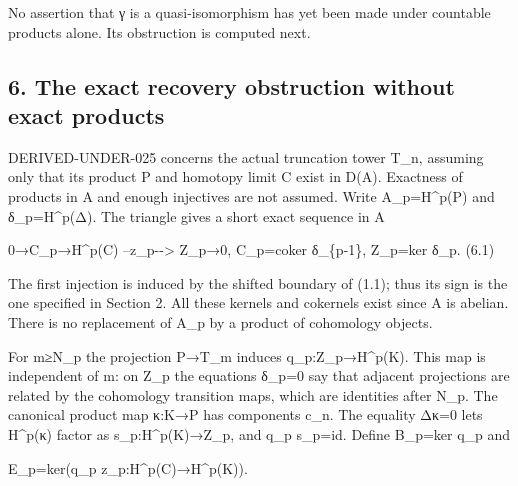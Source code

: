 \documentclass[11pt]{article}
\begin{document}
No assertion that γ is a quasi-isomorphism has yet been made under countable products alone. Its obstruction is computed next.

\subsection{6. The exact recovery obstruction without exact products}\label{proofs-10435-10686-the-exact-recovery-obstruction-without-exact-products}

DERIVED-UNDER-025 concerns the actual truncation tower T\_\allowbreak{}n,\allowbreak{} assuming only that its product P and homotopy limit C exist in D(A)\allowbreak{}. Exactness of products in A and enough injectives are not assumed. Write A\_\allowbreak{}p\allowbreak{}=H\textasciicircum{}p(P)\allowbreak{} and δ\_\allowbreak{}p\allowbreak{}=H\textasciicircum{}p(Δ)\allowbreak{}. The triangle gives a short exact sequence in A

0\allowbreak{}→C\_\allowbreak{}p\allowbreak{}→H\textasciicircum{}p(C)\allowbreak{} --z\_\allowbreak{}p-\allowbreak{}-> Z\_\allowbreak{}p\allowbreak{}→0,\allowbreak{} C\_\allowbreak{}p\allowbreak{}=coker δ\_\allowbreak{}\{p-1\},\allowbreak{} Z\_\allowbreak{}p\allowbreak{}=ker δ\_\allowbreak{}p. (6.1)\allowbreak{}

The first injection is induced by the shifted boundary of (1.1)\allowbreak{}; thus its sign is the one specified in Section 2. All these kernels and cokernels exist since A is abelian. There is no replacement of A\_\allowbreak{}p by a product of cohomology objects.

For m≥N\_\allowbreak{}p the projection P\allowbreak{}→T\_\allowbreak{}m induces q\_\allowbreak{}p:\allowbreak{}Z\_\allowbreak{}p\allowbreak{}→H\textasciicircum{}p(K)\allowbreak{}. This map is independent of m:\allowbreak{} on Z\_\allowbreak{}p the equations δ\_\allowbreak{}p\allowbreak{}=0 say that adjacent projections are related by the cohomology transition maps,\allowbreak{} which are identities after N\_\allowbreak{}p. The canonical product map κ:\allowbreak{}K\allowbreak{}→P has components c\_\allowbreak{}n. The equality Δκ\allowbreak{}=0 lets H\textasciicircum{}p(κ)\allowbreak{} factor as s\_\allowbreak{}p:\allowbreak{}H\textasciicircum{}p(K)\allowbreak{}\allowbreak{}→Z\_\allowbreak{}p,\allowbreak{} and q\_\allowbreak{}p s\_\allowbreak{}p\allowbreak{}=id. Define B\_\allowbreak{}p\allowbreak{}=ker q\_\allowbreak{}p and

E\_\allowbreak{}p\allowbreak{}=ker(q\_\allowbreak{}p z\_\allowbreak{}p:\allowbreak{}H\textasciicircum{}p(C)\allowbreak{}\allowbreak{}→H\textasciicircum{}p(K)\allowbreak{})\allowbreak{}.
\end{document}
